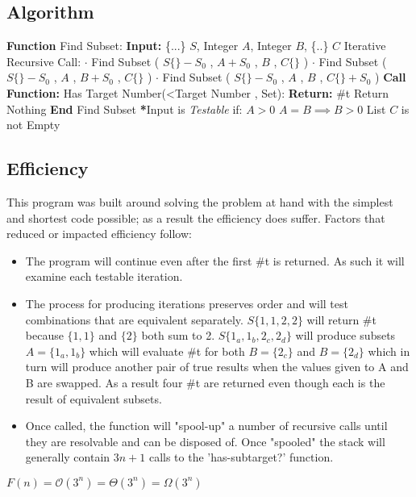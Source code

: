 \documentclass[a4paper,man,natbib]{apa6}
\begin{document}
\subsection{Algorithm}
\begin{algorithm}[H]
	\begin{algorithmic}
		\State \textbf{Function} Find Subset:
		\State \textbf{Input:} \{...\} $S$, Integer $A$, Integer $B$, \{..\} $C$
			\State Iterative Recursive Call:
			\State $\cdot$ Find Subset ( $S\{\}-S_0$ , $A+S_0$ , $B$ , $C\{\}$ )
			\State $\cdot$ Find Subset ( $S\{\}-S_0$ , $A$ , $B+S_0$ , $C\{\}$ )
			\State $\cdot$ Find Subset ( $S\{\}-S_0$ , $A$ , $B$ , $C\{\}+S_0$ )
			\State \textbf{Call Function:} Has Target Number(<Target Number , Set):
					\State \textbf{Return:} \#t
				\EndIf
			\State Return Nothing 
		\EndIf
		\State \textbf{End} Find Subset
		\State
		\State \textbf{*}Input is \emph{Testable} if:
			\State $A>0$
			\State $A=B \implies B>0$
			\State List $C$ is not Empty
	\end{algorithmic}
	\caption{}
\end{algorithm}

\clearpage
\subsection{Efficiency}
This program was built around solving the problem at hand with the simplest and shortest code possible; as a result the efficiency does suffer. Factors that reduced or impacted efficiency follow:
\begin{itemize}
	\item The program will continue even after the first \#t is returned. As such it will examine each testable iteration.
	\item The process for producing iterations preserves order and will test combinations that are equivalent separately.
	\subitem $S\{1,1,2,2\}$ will return \#t because $\{1,1\}$ and $\{2\}$ both sum to 2.
	\subitem $S\{1_a,1_b,2_c,2_d\}$ will produce subsets $A=\{1_a,1_b\}$ which will evaluate \#t for both $B=\{2_c\}$ and $B=\{2_d\}$ which in turn will produce another pair of true results when the values given to A and B are swapped.
	\subitem As a result four \#t are returned even though each is the result of equivalent subsets.
	\item Once called, the function will "spool-up" a number of recursive calls until they are resolvable and can be disposed of. Once "spooled" the stack will generally contain $3n+1$ calls to the 'has-subtarget?' function.
\end{itemize}
$F(n) = \mathcal{O}(3^n) = \Theta(3^n) = \Omega(3^n)$
\clearpage
\end{document}

